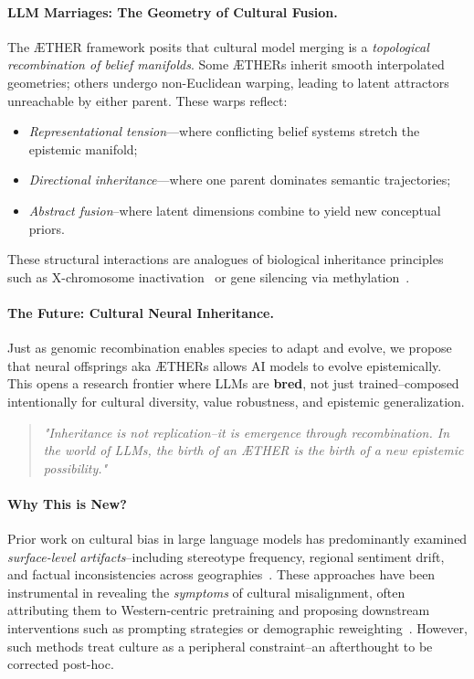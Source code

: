 \paragraph{\textbf{LLM Marriages: The Geometry of Cultural Fusion.}}
The \AE{}THER framework posits that cultural model merging is a \emph{topological recombination of belief manifolds}. Some \AE{}THERs inherit smooth interpolated geometries; others undergo non-Euclidean warping, leading to latent attractors unreachable by either parent. These warps reflect:
\begin{itemize}[leftmargin=1.5em]
\item \emph{Representational tension}---where conflicting belief systems stretch the epistemic manifold;
\item \emph{Directional inheritance}---where one parent dominates semantic trajectories;
\item \emph{Abstract fusion}--where latent dimensions combine to yield new conceptual priors.
\end{itemize}
These structural interactions are analogues of biological inheritance principles such as X-chromosome inactivation~\citep{brockdorff2013xchromosome} or gene silencing via methylation~\citep{bird2002dna}.



\vspace{0.8em}
\paragraph{\textbf{The Future: Cultural Neural Inheritance.}}
Just as genomic recombination enables species to adapt and evolve, we propose that neural offsprings aka \AE{}THERs allows AI models to evolve epistemically. This opens a research frontier where LLMs are \textbf{bred}, not just trained--composed intentionally for cultural diversity, value robustness, and epistemic generalization.

\begin{quote}
\emph{"Inheritance is not replication--it is emergence through recombination. In the world of LLMs, the birth of an \AE{}THER is the birth of a new epistemic possibility."}
\end{quote}



\paragraph{\textbf{Why This is New?}} 
Prior work on cultural bias in large language models has predominantly examined \emph{surface-level artifacts}--including stereotype frequency, regional sentiment drift, and factual inconsistencies across geographies~\cite{lauscher2020multi, tao2023cultural, zhao2023assessing, tan2023evaluations}. These approaches have been instrumental in revealing the \textit{symptoms} of cultural misalignment, often attributing them to Western-centric pretraining and proposing downstream interventions such as prompting strategies or demographic reweighting~\cite{xia2023demographic, tao2023pnas}. However, such methods treat culture as a peripheral constraint--an afterthought to be corrected post-hoc.

